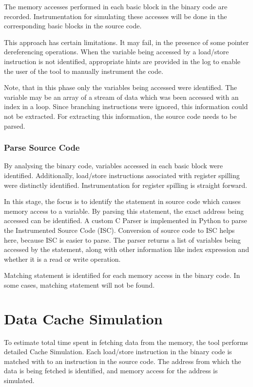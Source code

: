 The memory accesses performed in each basic block in the binary code are recorded. Instrumentation for simulating these accesses will be done in the corresponding basic blocks in the source code. 

This approach has certain limitations. It may fail, in the presence of some pointer dereferencing operations. When the variable being accessed by a load/store instruction is not identified, appropriate hints are provided in the log to enable the user of the tool to manually instrument the code.

Note, that in this phase only the variables being accessed were identified. The variable may be an array of a stream of data which was been accessed with an index in a loop. Since branching instructions were ignored, this information could not be extracted. For extracting this information, the source code needs to be parsed.

\subsubsection{Parse Source Code}
By analysing the binary code, variables accessed in each basic block were identified. Additionally, load/store instructions associated with register spilling were distinctly identified. Instrumentation for register spilling is straight forward.

In this stage, the focus is to identify the statement in source code which causes memory access to a variable. By parsing this statement, the exact address being accessed can be identified. A custom C Parser is implemented in Python to parse the Instrumented Source Code (ISC). Conversion of source code to ISC helps here, because ISC is easier to parse. The parser returns a list of variables being accessed by the statement, along with other information like index expression and whether it is a read or write operation.

Matching statement is identified for each memory access in the binary code. In some cases, matching statement will not be found.

\section{Data Cache Simulation}
To estimate total time spent in fetching data from the memory, the tool performs detailed Cache Simulation. Each load/store instruction in the binary code is matched with to an instruction in the source code. The address from which the data is being fetched is identified, and memory access for the address is simulated. 

